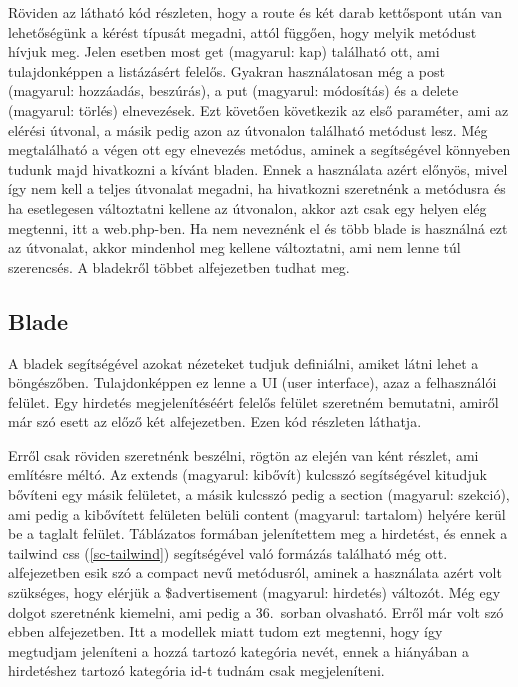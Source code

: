 \documentclass[]{thesis-ekf}
\theoremstyle{definition}
\theoremstyle{remark}
\begin{document}
	
	
	Röviden az látható  kód részleten, hogy a route és két darab kettőspont után van lehetőségünk a kérést típusát megadni, attól függően, hogy melyik metódust hívjuk meg. Jelen esetben most get (magyarul: kap) található ott, ami tulajdonképpen a listázásért felelős. Gyakran használatosan még a post (magyarul: hozzáadás, beszúrás), a put (magyarul: módosítás) és a delete (magyarul: törlés) elnevezések. Ezt követően következik az első paraméter, ami az elérési útvonal, a másik pedig azon az útvonalon található metódust lesz. Még megtalálható a végen ott egy elnevezés metódus, aminek a segítségével könnyeben tudunk majd hivatkozni a kívánt bladen. Ennek a használata azért előnyös, mivel így nem kell a teljes útvonalat megadni, ha hivatkozni szeretnénk a metódusra és ha esetlegesen változtatni kellene az útvonalon, akkor azt csak egy helyen elég megtenni, itt a web.php-ben. Ha nem neveznénk el és több blade is használná ezt az útvonalat, akkor mindenhol meg kellene változtatni, ami nem lenne túl szerencsés. A bladekről többet  alfejezetben tudhat meg.
	
	\subsection{Blade}\label{sc-blade}
	A bladek segítségével azokat nézeteket tudjuk definiálni, amiket látni lehet a böngészőben. Tulajdonképpen ez lenne a UI (user interface), azaz a felhasználói felület. Egy hirdetés megjelenítéséért felelős felület szeretném bemutatni, amiről már szó esett az előző két alfejezetben. Ezen  kód részleten láthatja.
		
	
	
	Erről csak röviden szeretnénk beszélni, rögtön az elején van ként részlet, ami említésre méltó. Az extends (magyarul: kibővít) kulcsszó segítségével kitudjuk bővíteni egy másik felületet, a másik kulcsszó pedig a section (magyarul: szekció), ami pedig a kibővített felületen belüli content (magyarul: tartalom) helyére kerül be a taglalt felület. Táblázatos formában jelenítettem meg a hirdetést, és ennek a tailwind css (\ref{sc-tailwind}) segítségével való formázás található még ott.  alfejezetben esik szó a compact nevű metódusról, aminek a használata azért volt szükséges, hogy elérjük a \$advertisement (magyarul: hirdetés) változót. Még egy dolgot szeretnénk kiemelni, ami pedig a 36.~sorban olvasható. Erről már volt szó ebben  alfejezetben. Itt a modellek miatt tudom ezt megtenni, hogy így megtudjam jeleníteni a hozzá tartozó kategória nevét, ennek a hiányában a hirdetéshez tartozó kategória id-t tudnám csak megjeleníteni.
	
\end{document}

